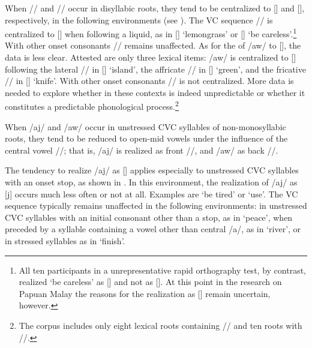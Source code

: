 When // and // occur in disyllabic roots, they tend to be centralized to [] and [], respectively, in the following environments (see ). The VC sequence // is centralized to [] when following a liquid, as in  [] ‘lemongrass’ or  [] ‘be careless’.\footnote{All ten participants in a unrepresentative rapid orthography test, by contrast, realized  ‘be careless’ as [] and not as []. At this point in the research on Papuan Malay the reasons for the realization as [] remain uncertain, however.} With other onset consonants // remains unaffected. As for the  of /aw/ to [], the data is less clear. Attested are only three lexical items: /aw/ is centralized to [] following the lateral // in  [] ‘island’, the affricate // in  [] ‘green’, and the fricative // in  [] ‘knife’. With other onset consonants // is not centralized. More data is needed to explore whether  in these contexts is indeed unpredictable or whether it constitutes a predictable phonological process.\footnote{The corpus includes only eight lexical roots containing // and ten roots with //.}




When /aj/ and /aw/ occur in unstressed CVC syllables of non-monosyllabic roots, they tend to be reduced to open-mid vowels under the influence of the central vowel //; that is, /aj/ is realized as front //, and /aw/ as back //.



The tendency to realize /aj/ as [] applies especially to unstressed CVC syllables with an onset stop, as shown in . In this environment, the realization of /aj/ as [j] occurs much less often or not at all. Examples are  ‘be tired’ or  ‘use’. The VC sequence typically remains unaffected in the following environments: in unstressed CVC syllables with an initial consonant other than a stop, as in  ‘peace’, when preceded by a syllable containing a vowel other than central /a/, as in  ‘river’, or in stressed syllables as in  ‘finish’.

